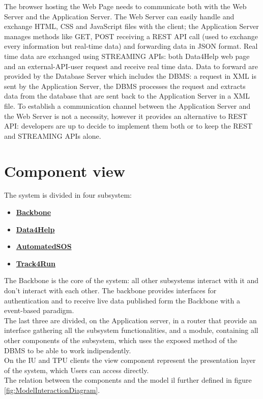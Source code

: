The browser hosting the Web Page needs to communicate both with the Web Server and the Application Server. 
The Web Server can easily handle and exchange HTML, CSS and JavaScript files with the client; the Application Server manages methods like GET, POST receiving a REST API call (used to exchange every information but real-time data) and forwarding data in JSON format. Real time data are exchanged using STREAMING APIs: both Data4Help web page and an external-API-user request and receive real time data. Data to forward are provided by the Database Server which includes the DBMS: a request in XML is sent by the Application Server, the DBMS processes the request and extracts data from the database that are sent back to the Application Server in a XML file. To establish a communication channel between the Application Server and the Web Server is not a necessity, however it provides an alternative to REST API: developers are up to decide to implement them both or to keep the REST and STREAMING APIs alone. 

\section{Component view}
The system is divided in four subsystem:
\begin{itemize}
\item \textbf{\href{subsect:backboneComponentView}{Backbone}}
\item \textbf{\href{subsect:D4HComponentView}{Data4Help}}
\item \textbf{\href{subsect:ASOSComponentView}{AutomatedSOS}}
\item \textbf{\href{subsect:T4RComponentView}{Track4Run}}
\end{itemize}
The Backbone is the core of the system: all other subsystems interact with it and don't interact with each other. The backbone provides interfaces for authentication and to receive live data published form the Backbone with a event-based paradigm.\\
The last three are divided, on the Application server, in a router that provide an interface gathering all the subsystem functionalities, and a module, containing all other components of the subsystem, which uses the exposed method of the DBMS to be able to work indipendently. \\
On the IU and TPU clients the view component represent the presentation layer of the system, which Users can access directly.\\
The relation between the components and the model il further defined in figure \ref{fig:ModelInteractionDiagram}.
